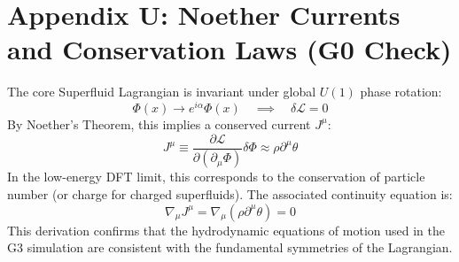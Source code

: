 \section{Appendix U: Noether Currents and Conservation Laws (G0 Check)}
\label{app:noether}

The core Superfluid Lagrangian is invariant under global $U(1)$ phase rotation:
\begin{equation}
    \Phi(x) \to e^{i\alpha} \Phi(x) \quad \implies \quad \delta \mathcal{L} = 0
\end{equation}
By Noether's Theorem, this implies a conserved current $J^\mu$:
\begin{equation}
    J^\mu \equiv \frac{\partial \mathcal{L}}{\partial (\partial_\mu \Phi)} \delta \Phi \approx \rho \partial^\mu \theta
\end{equation}
In the low-energy DFT limit, this corresponds to the conservation of particle number (or charge for charged superfluids). The associated continuity equation is:
\begin{equation}
    \nabla_\mu J^\mu = \nabla_\mu (\rho \partial^\mu \theta) = 0
\end{equation}
This derivation confirms that the hydrodynamic equations of motion used in the G3 simulation are consistent with the fundamental symmetries of the Lagrangian.
